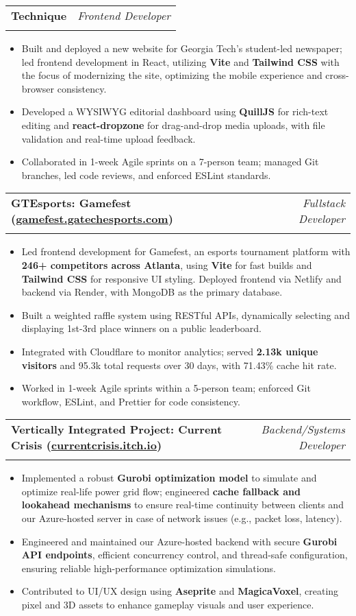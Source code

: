 \documentclass[letterpaper,11pt]{article}
\makeatletter
\newcommand{\resumeItem}[1]{
  \item\small{
    {#1 \vspace{-2pt}}
  }
}
\newcommand{\resumeSubheading}[4]{
  \vspace{-2pt}\item
    \begin{tabular*}{0.97\textwidth}[t]{l@{\extracolsep{\fill}}r}
      \textbf{#1} & #2 \\
      \textit{\small#3} & \textit{\small #4} \\
    \end{tabular*}\vspace{-7pt}
}
\newcommand{\resumeItemListStart}{\begin{itemize}}
\newcommand{\resumeItemListEnd}{\end{itemize}\vspace{-8pt}}
\makeatother
\begin{document}
    \resumeSubheading
    {Technique}{\textit{Frontend Developer}}
    {}{}
    \resumeItemListStart
    \vspace{-5mm}
      \resumeItem{Built and deployed a new website for Georgia Tech's student-led newspaper; led frontend development in React, utilizing \textbf{Vite} and \textbf{Tailwind CSS} with the focus of modernizing the site, optimizing the mobile experience and cross-browser consistency.}
      \resumeItem{Developed a WYSIWYG editorial dashboard using \textbf{QuillJS} for rich-text editing and \textbf{react-dropzone} for drag-and-drop media uploads, with file validation and real-time upload feedback.}
      \resumeItem{Collaborated in 1-week Agile sprints on a 7-person team; managed Git branches, led code reviews, and enforced ESLint standards.}
    \resumeItemListEnd
    
    \resumeSubheading
    {GTEsports: Gamefest (\href{https://gamefest.gatechesports.com/home}{\underline{gamefest.gatechesports.com}})}{\textit{Fullstack Developer}}
    {}{}
    \resumeItemListStart
    \vspace{-5mm}
    \resumeItem{Led frontend development for Gamefest, an esports tournament platform with \textbf{246+ competitors across Atlanta}, using \textbf{Vite} for fast builds and \textbf{Tailwind CSS} for responsive UI styling. Deployed frontend via Netlify and backend via Render, with MongoDB as the primary database.}
      \resumeItem{Built a weighted raffle system using RESTful APIs, dynamically selecting and displaying 1st-3rd place winners on a public leaderboard.}
      \resumeItem{Integrated with Cloudflare to monitor analytics; served \textbf{2.13k unique visitors} and 95.3k total requests over 30 days, with 71.43\% cache hit rate.}
      \resumeItem{Worked in 1-week Agile sprints within a 5-person team; enforced Git workflow, ESLint, and Prettier for code consistency.}
    \resumeItemListEnd    

    \resumeSubheading
    {Vertically Integrated Project: Current Crisis (\href{https://currentcrisis.itch.io/current-crisis}{\underline{currentcrisis.itch.io}})}{\textit{Backend/Systems Developer}}
    {}{}
    \resumeItemListStart
    \vspace{-5mm}
      \resumeItem{Implemented a robust \textbf{Gurobi optimization model} to simulate and optimize real-life power grid flow; engineered \textbf{cache fallback and lookahead mechanisms} to ensure real-time continuity between clients and our Azure-hosted server in case of network issues (e.g., packet loss, latency).}
      \resumeItem{Engineered and maintained our Azure-hosted backend with secure \textbf{Gurobi API endpoints}, efficient concurrency control, and thread-safe configuration, ensuring reliable high-performance optimization simulations.}
      \resumeItem{Contributed to UI/UX design using \textbf{Aseprite} and \textbf{MagicaVoxel}, creating pixel and 3D assets to enhance gameplay visuals and user experience.}
    \resumeItemListEnd
    
\end{document}
